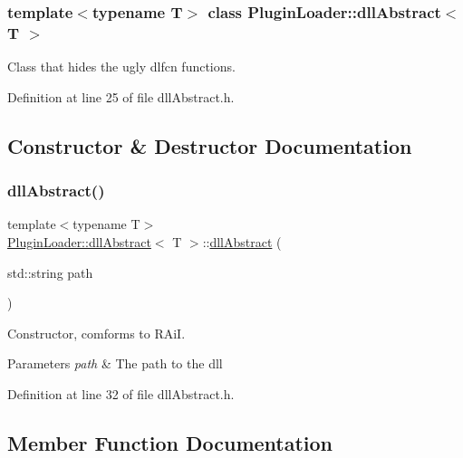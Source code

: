 \subsubsection*{template$<$typename T$>$\newline
class Plugin\+Loader\+::dll\+Abstract$<$ T $>$}

Class that hides the ugly dlfcn functions. 

Definition at line 25 of file dll\+Abstract.\+h.



\subsection{Constructor \& Destructor Documentation}
\mbox{\label{classPluginLoader_1_1dllAbstract_a2d525fbaf23c88ac0bfbc5321a09ef8d}} 
\subsubsection{\texorpdfstring{dllAbstract()}{dllAbstract()}}
{\footnotesize\ttfamily template$<$typename T$>$ \\
\mbox{\hyperlink{classPluginLoader_1_1dllAbstract}{Plugin\+Loader\+::dll\+Abstract}}$<$ T $>$\+::\mbox{\hyperlink{classPluginLoader_1_1dllAbstract}{dll\+Abstract}} (\begin{DoxyParamCaption}\item[{std\+::string}]{path }\end{DoxyParamCaption})\hspace{0.3cm}{\ttfamily [inline]}}



Constructor, comforms to R\+AiI. 


\begin{DoxyParams}{Parameters}
{\em path} & The path to the dll \\
\hline
\end{DoxyParams}


Definition at line 32 of file dll\+Abstract.\+h.



\subsection{Member Function Documentation}
\mbox{\label{classPluginLoader_1_1dllAbstract_a1560b7381d7c034642245022479f21e7}} 
